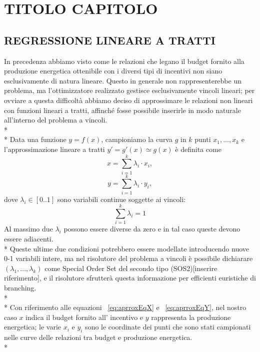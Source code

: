 \documentclass[12pt,a4paper,openright,twoside]{report}
\begin{document}
\chapter{TITOLO CAPITOLO}


\section{REGRESSIONE LINEARE A TRATTI}

In precedenza abbiamo visto come le relazioni che legano il budget fornito alla produzione energetica ottenibile con i diversi tipi di incentivi non siano esclusivamente di natura lineare. Questo in generale non rappresenterebbe un problema, ma l'ottimizzatore realizzato gestisce esclusivamente vincoli lineari; per ovviare a questa difficoltà abbiamo deciso di approssimare le relazioni non lineari con funzioni lineari a tratti,‌ affinché fosse possibile inserirle in modo naturale all'interno del problema a vincoli.
\\* \\* 
Data una funzione $y=f(x)$, campioniamo la curva $g$ in $k$ punti $x_1,...,x_k$ e l'approssimazione lineare a tratti $y'=g'(x)\simeq g(x)$ è definita come
\begin{equation} \label{eq:aprroxEqX}
	x = \sum_{i=1}^k \lambda_i \cdot x_i,
\end{equation}
\begin{equation} \label{eq:aprroxEqY}
	y = \sum_{i=1}^k \lambda_i \cdot y_i,
\end{equation}
dove $\lambda_i \in [0..1]$ sono variabili continue soggette ai vincoli:
\begin{equation} \label{eq:aprroxEqLambda}
	\sum_{i=1}^k \lambda_i = 1
\end{equation}
Al massimo due $\lambda_i$ possono essere diverse da zero e in tal caso queste devono essere adiacenti.\\*
Queste ultime due condizioni potrebbero essere modellate introducendo nuove 0-1 variabili intere, ma nel risolutore del problema a vincoli è possibile dichiarare $(\lambda_1,...,\lambda_k)$ come Special Order Set del secondo tipo (SOS2)[inserire riferimento], e il risolutore sfrutterà questa informazione per efficienti euristiche di branching.  
\\* \\*
Con riferimento alle equazioni ~\ref{eq:aprroxEqX} e ~\ref{eq:aprroxEqY}, nel nostro caso $x$ indica il budget fornito all' incentivo e $y$ rappresenta la produzione energetica; le varie $x_i$ e $y_i$ sono le coordinate dei punti che sono stati campionati nelle curve delle relazioni tra budget e produzione energetica.\\*
\end{document}
